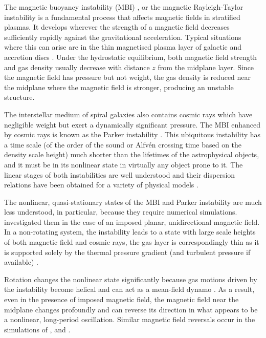 \documentclass[fleqn,usenatbib]{mnras}
\begin{document}
The magnetic buoyancy instability (MBI) \citep{N61}, or the magnetic
Rayleigh-Taylor instability is a fundamental process that affects magnetic
fields in stratified plasmas. It develops wherever the strength of a magnetic
field decreases sufficiently rapidly against the gravitational acceleration.
Typical situations where this can arise are in the thin magnetised plasma layer
of galactic \citep{Rodrigues2016,KNPS19,SBADMN19} and accretion discs
\citep{VB97,BH98,Blackman12,JSD14}.  Under the hydrostatic equilibrium, both
magnetic field strength and gas density usually decrease with distance $z$ from
the midplane layer. Since the magnetic field has pressure but not weight, the
gas density is reduced near the midplane where the magnetic field is stronger,
producing an unstable structure.

The interstellar medium of spiral galaxies also contains cosmic rays which have
negligible weight but exert a dynamically significant pressure. The MBI
enhanced by cosmic rays is known as the Parker instability \citep{Parker1979}.
This ubiquitous instability has a time scale (of the order of the sound or
Alfv\'en crossing time based on the density scale height) much shorter than the
lifetimes of the astrophysical objects, and it must be in its nonlinear state
in virtually any object prone to it. The linear stages of both instabilities
are well understood and their dispersion relations have been obtained for a
variety of physical models \citep[e.g.,][see also \citealt{SS21} and references
therein]{Giz1993,FT94,FT95,Kim1997,Rodrigues2016,DT2022a}.

The nonlinear, quasi-stationary states of the MBI and Parker instability are
much less understood, in particular, because they require numerical
simulations.  \citet{DT2022a,DT2022b} investigated them in the case of an
imposed planar, unidirectional magnetic field. In a non-rotating system, the
instability leads to a state with large scale heights of both magnetic field
and cosmic rays, the gas layer is correspondingly thin as it is supported
solely by the thermal pressure gradient (and turbulent pressure if available)
\citep{DT2022a}.

Rotation changes the nonlinear state significantly because gas motions driven
by the instability become helical and can act as a mean-field dynamo
\citep[e.g.,][see also \citealt{HL1997a} and \citealt{1999MOSS} and references
therein]{DT2022b}. As a result, even in the presence of imposed magnetic field,
the magnetic field near the midplane changes profoundly and can reverse its
direction in what appears to be a nonlinear, long-period oscillation. Similar
magnetic field reversals occur in the simulations of \citet{JoLe08},
\citet{GJL12} and \citet{MNKASM2013}.
\end{document}
